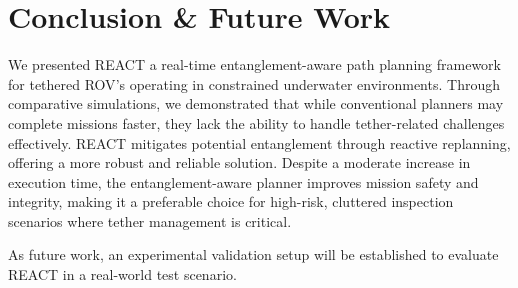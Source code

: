 
\section{Conclusion & Future Work}
\label{sec:conclusion}
We presented \ac{REACT} a real-time entanglement-aware path planning framework for tethered \ac{ROV}'s operating in constrained underwater environments. Through comparative simulations, we demonstrated that while conventional planners may complete missions faster, they lack the ability to handle tether-related challenges effectively. \ac{REACT} mitigates potential entanglement through reactive replanning, offering a more robust and reliable solution. Despite a moderate increase in execution time, the entanglement-aware planner improves mission safety and integrity, making it a preferable choice for high-risk, cluttered inspection scenarios where tether management is critical. 

As future work, an experimental validation setup will be established to evaluate \ac{REACT} in a real-world test scenario. 





